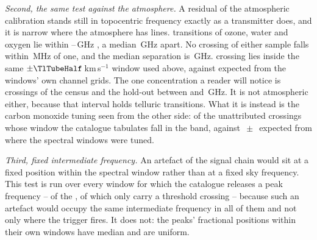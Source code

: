 \emph{Second, the same test against the atmosphere.} A residual of the
atmospheric calibration stands still in topocentric frequency exactly as a
transmitter does, and it is narrow where the atmosphere has lines.
\TlNLine{} transitions of ozone, water and oxygen lie within
\TlFreqLo--\TlFreqHi\,GHz \citep{Pickett1998}, a median \TlSpacing\,GHz
apart. No crossing of either sample falls within \TlOffMin\,MHz of one, and the
median separation is \TlOffMed\,GHz. \TlTubeObs{} crossing lies inside the
same $\pm\TlTubeHalf$\,km\,s$^{-1}$ window used above, against
\TlTubeNull{} expected from the windows' own channel grids. The one
concentration a reader will notice is \TlBandAll{} crossings of the census
and the hold-out between \TlBandLo{} and \TlBandHi\,GHz. It is not
atmospheric either, because that interval holds \TlBandNLine{} telluric
transitions. What it is instead is the carbon monoxide tuning seen from the
other side: \TlBandObs{} of the \TlBandNSub{} unattributed crossings whose
window the catalogue tabulates fall in the band, against
\TlBandNull$\,\pm\,$\TlBandNullSd{} expected from where the spectral windows
were tuned.

\emph{Third, fixed intermediate frequency.} An artefact of the signal chain
would sit at a fixed position within the spectral window rather than at a
fixed sky frequency. This test is run over every window for which the
catalogue releases a peak frequency -- \IfPopNWin{} of the \NWindows{}, of
which only \IfPopNCross{} carry a threshold crossing -- because such an
artefact would
occupy the same intermediate frequency in all of them and not only where the
trigger fires. It does not: the peaks' fractional positions within their own
windows have median \RfiFracMed{} and are uniform.

